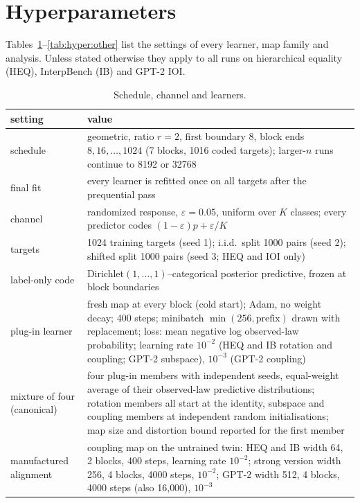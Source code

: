 \documentclass[11pt,a4paper]{article}
\begin{document}
\section{Hyperparameters}
\label{app:hyper}

Tables~\ref{tab:hyper}--\ref{tab:hyper:other} list the settings of every learner, map family and analysis. Unless stated otherwise they apply to all runs on hierarchical equality (HEQ), InterpBench (IB) and GPT-2 IOI.

\begin{table}[htbp]
\centering
\footnotesize
\caption{Schedule, channel and learners.}
\label{tab:hyper}
\begin{tabular}{p{}p{}}
\toprule
setting & value\\
\midrule
schedule & geometric, ratio $r=2$, first boundary 8, block ends $8,16,\dots,1024$ (7 blocks, 1016 coded targets); larger-$n$ runs continue to 8192 or 32768\\
final fit & every learner is refitted once on all targets after the prequential pass\\
channel & randomized response, $\varepsilon=0.05$, uniform over $K$ classes; every predictor codes $(1-\varepsilon)p+\varepsilon/K$\\
targets & 1024 training targets (seed 1); i.i.d.\ split 1000 pairs (seed 2); shifted split 1000 pairs (seed 3; HEQ and IOI only)\\
label-only code & Dirichlet$(1,\dots,1)$--categorical posterior predictive, frozen at block boundaries\\
\midrule
plug-in learner & fresh map at every block (cold start); Adam, no weight decay; 400 steps; minibatch $\min(256,\text{prefix})$ drawn with replacement; loss: mean negative log observed-law probability; learning rate $10^{-2}$ (HEQ and IB rotation and coupling; GPT-2 subspace), $10^{-3}$ (GPT-2 coupling)\\
mixture of four (canonical) & four plug-in members with independent seeds, equal-weight average of their observed-law predictive distributions; rotation members all start at the identity, subspace and coupling members at independent random initialisations; map size and distortion bound reported for the first member\\
manufactured alignment & coupling map on the untrained twin: HEQ and IB width 64, 2 blocks, 400 steps, learning rate $10^{-2}$; strong version width 256, 4 blocks, 4000 steps, $10^{-2}$; GPT-2 width 512, 4 blocks, 4000 steps (also 16{,}000), $10^{-3}$\\

\end{tabular}
\end{table}
\end{document}
